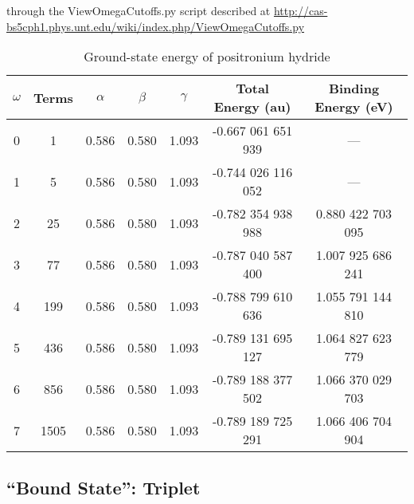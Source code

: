 \documentclass[Dissertation.tex]{subfiles}
\begin{document}
through the ViewOmegaCutoffs.py script described at \url{http://cas-bs5cph1.phys.unt.edu/wiki/index.php/ViewOmegaCutoffs.py}

\setlength{\abovecaptionskip}{6pt}   %
\setlength{\belowcaptionskip}{6pt}   %
\begin{table}[H]
\centering
\begin{tabular}{c c c c c c c}
\toprule
$\omega$ & Terms & $\alpha$ & $\beta$ & $\gamma$ & Total Energy (au) & Binding Energy (eV) \\ [0.5ex]
\midrule
0 & 1 & 0.586 & 0.580 & 1.093 & -0.667 061 651 939 & --- \\
1 & 5 & 0.586 & 0.580 & 1.093 & -0.744 026 116 052 & --- \\
2 & 25 & 0.586 & 0.580 & 1.093 & -0.782 354 938 988 & 0.880 422 703 095 \\
3 & 77 & 0.586 & 0.580 & 1.093 & -0.787 040 587 400 & 1.007 925 686 241 \\
4 & 199 & 0.586 & 0.580 & 1.093 & -0.788 799 610 636 & 1.055 791 144 810 \\
5 & 436 & 0.586 & 0.580 & 1.093 & -0.789 131 695 127 & 1.064 827 623 779 \\
6 & 856 & 0.586 & 0.580 & 1.093 & -0.789 188 377 502 & 1.066 370 029 703 \\
7 & 1505 & 0.586 & 0.580 & 1.093 & -0.789 189 725 291 & 1.066 406 704 904 \\
\bottomrule
\end{tabular}
\caption{Ground-state energy of positronium hydride} %
\label{tab:BoundEnergyTodd1}
\end{table}



\subsection{``Bound State'': Triplet}
\end{document}
